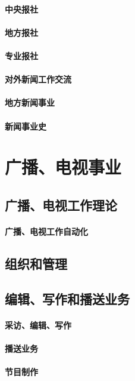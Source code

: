 \documentclass[UTF8]{../../ApplicationUniverse}
\begin{document}
        \subsubsection{中央报社}
        \subsubsection{地方报社}
        \subsubsection{专业报社}
        \subsubsection{对外新闻工作交流}
        \subsubsection{地方新闻事业}
        \subsubsection{新闻事业史}
 



\chapter{广播、电视事业}
\section{广播、电视工作理论}
    \subsubsection{广播、电视工作自动化}
\section{组织和管理}
\section{编辑、写作和播送业务}
    \subsubsection{采访、编辑、写作}
    \subsubsection{播送业务}
    \subsubsection{节目制作}
\end{document}
